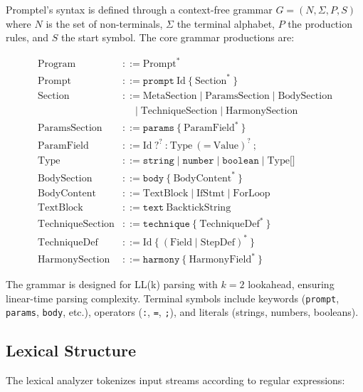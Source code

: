 \documentclass[11pt,a4paper]{article}
\begin{document}
Promptel's syntax is defined through a context-free grammar $G = (N, \Sigma, P, S)$ where $N$ is the set of non-terminals, $\Sigma$ the terminal alphabet, $P$ the production rules, and $S$ the start symbol. The core grammar productions are:

\begin{align*}
\text{Program} &::= \text{Prompt}^* \\
\text{Prompt} &::= \texttt{prompt}\ \text{Id}\ \{\ \text{Section}^*\ \} \\
\text{Section} &::= \text{MetaSection} \mid \text{ParamsSection} \mid \text{BodySection} \\
                &\quad \mid \text{TechniqueSection} \mid \text{HarmonySection} \\
\text{ParamsSection} &::= \texttt{params}\ \{\ \text{ParamField}^*\ \} \\
\text{ParamField} &::= \text{Id}\ \texttt{?}^?\ \texttt{:}\ \text{Type}\ (\texttt{=}\ \text{Value})^?\ \texttt{;} \\
\text{Type} &::= \texttt{string} \mid \texttt{number} \mid \texttt{boolean} \mid \text{Type}\texttt{[]} \\
\text{BodySection} &::= \texttt{body}\ \{\ \text{BodyContent}^*\ \} \\
\text{BodyContent} &::= \text{TextBlock} \mid \text{IfStmt} \mid \text{ForLoop} \\
\text{TextBlock} &::= \texttt{text}\ \text{BacktickString} \\
\text{TechniqueSection} &::= \texttt{technique}\ \{\ \text{TechniqueDef}^*\ \} \\
\text{TechniqueDef} &::= \text{Id}\ \{\ (\text{Field} \mid \text{StepDef})^*\ \} \\
\text{HarmonySection} &::= \texttt{harmony}\ \{\ \text{HarmonyField}^*\ \}
\end{align*}

The grammar is designed for LL(k) parsing with $k=2$ lookahead, ensuring linear-time parsing complexity. Terminal symbols include keywords (\texttt{prompt}, \texttt{params}, \texttt{body}, etc.), operators (\texttt{:}, \texttt{=}, \texttt{;}), and literals (strings, numbers, booleans).

\subsection{Lexical Structure}

The lexical analyzer tokenizes input streams according to regular expressions:
\end{document}
